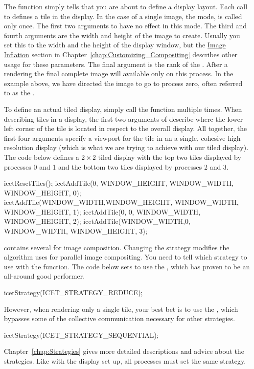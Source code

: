 The  function simply tells \IceT that you are about
to define a display layout.  Each call to  defines a
tile in the display.  In the case of a single image, the
 mode,
 is called only once.  The first two arguments to
 have no effect in this mode.  The third and fourth
arguments are the width and height of the image to create.  Usually you set
this to the width and the height of the display window, but the
\hyperref[sec:Customizing_Compositing:Image_Inflation]{Image Inflation}
section in Chapter~\ref{chap:Customizing_Compositing} describes other usage
for these parameters.  The final argument is the rank of the
.  After a rendering the
final complete image will available only on this process.  In the example
above, we have directed the image to go to process zero, often referred to
as the .

To define an actual tiled display, simply call the 
function multiple times.  When describing tiles in a display, the first two
arguments of  describe where the lower left corner of
the tile is located in respect to the overall display.  All together, the
first four arguments specify a viewport for the tile in an a single,
cohesive high resolution display (which is what we are trying to achieve
with our tiled display).  The code below defines a $2 \times 2$ tiled
display with the top two tiles displayed by processes 0 and 1 and the
bottom two tiles displayed by processes 2 and 3.
\begin{code}
icetResetTiles();
icetAddTile(0,           WINDOW_HEIGHT, WINDOW_WIDTH, WINDOW_HEIGHT, 0);
icetAddTile(WINDOW_WIDTH,WINDOW_HEIGHT, WINDOW_WIDTH, WINDOW_HEIGHT, 1);
icetAddTile(0,           0,             WINDOW_WIDTH, WINDOW_HEIGHT, 2);
icetAddTile(WINDOW_WIDTH,0,             WINDOW_WIDTH, WINDOW_HEIGHT, 3);
\end{code}

\IceT contains several  for image
composition.  Changing the strategy modifies the algorithm \IceT uses for
parallel image compositing.  You need to tell \IceT which strategy to use
with the  function.  The code below sets \IceT to use
the , which has proven to
be an all-around good performer.
\begin{code}
icetStrategy(ICET_STRATEGY_REDUCE);
\end{code}
However, when rendering only a single tile, your best bet is to use the
, which bypasses
some of the collective communication necessary for other strategies.
\begin{code}
icetStrategy(ICET_STRATEGY_SEQUENTIAL);
\end{code}
Chapter~\ref{chap:Strategies} gives more detailed descriptions and advice
about the strategies.  Like with the display set up, all processes must set
the same strategy.

